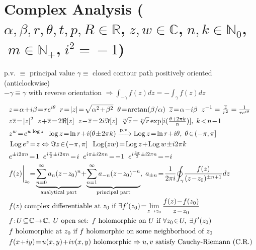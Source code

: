 \section*{Complex Analysis\normalfont\scriptsize{ ($\alpha,\beta,r,\theta,t,p,R\!\in\!\mathbb{R}$,$\;z,w\!\in\!\mathbb{C}$,$\;n,k\!\in\!\mathbb{N}_0$,$\;m\!\in\!\mathbb{N}_+$,$\;i^2\!=\!-1$)}}
\normalfont\scriptsize{ p.v. $\equiv$\! principal value \; $\gamma \equiv$ closed contour path positively oriented (anticlockwise)}\\
\normalfont\scriptsize{$-\gamma\equiv \gamma$ with reverse orientation $\Rightarrow\int_{-\gamma} f(z)dz= -\int_{\gamma}f(z)dz$}
\begin{align*}
&z\!=\!\alpha\!+\!i\beta\!=\!re^{i\theta}\;\;r\!=\!|z|\!=\!\sqrt{\alpha^2\!+\!\beta^2}\;\;\theta\!=\!\arctan(\beta/\alpha)\;\;\overline{z}\!=\!\alpha\!-\!i\beta \; \; z^{-1}=\tfrac{\overline{z}}{r^{2}} = \tfrac{1}{re^{i\theta}}\\
&z\overline{z}\!=\!|z|^2\;\;z\!+\!\overline{z}\!=\!2\Re[z]\;\;z\!-\!\overline{z}\!=\!2i\Im[z]\;\;\sqrt[n]{z}\!=\!\sqrt[n]{r}\exp[i(\tfrac{\theta+2\pi k}{n})],\;k\!<\!n\!-\!1 \\
&z^w\!=\!e^{w\log z}\;\;\log z\!=\!\ln r\!+\!i(\theta\!\pm\!2\pi k)\xrightarrow{\text{p.v.}}\operatorname{Log}z\!=\!\ln r\!+\!i\theta,\;\theta\!\in\!(-\pi,\pi] \\
&\operatorname{Log}e^z\!=\!z\Leftrightarrow\Im z\!\in\!(-\pi,\pi]\;\;\operatorname{Log}(zw)\!=\!\operatorname{Log}z\!+\!\operatorname{Log}w\!\pm\!i2\pi k \\
&e^{\pm i2\pi n}\!=\!1\;\;e^{i\frac{\pi}{2}\pm i2\pi n}\!=\!i\;\;e^{i\pi\pm i2\pi n}\!=\!-1\;\;e^{i\frac{3\pi}{2}\pm i2\pi n}\!=\!-i \\
&f(z)\bigg|_{z_0}\!\!=\!\underbrace{\sum_{n=0}^\infty a_n(z\!-\!z_0)^n}_{\text{\scriptsize analytical part}}\!+\!\underbrace{\sum_{n=1}^\infty a_{-n}(z\!-\!z_0)^{-n}}_{\text{\scriptsize principal part}},\;a_{\pm n}\!=\!\frac{1}{2\pi i}\!\oint_\gamma\!\frac{f(z)}{(z\!-\!z_0)^{\pm n+1}}dz \\
&\text{$f(z)$ complex differentiable at $z_0$ if }\exists f'(z_0)\!=\!\lim_{z\to z_0}\frac{f(z)\!-\!f(z_0)}{z\!-\!z_0} \\
&f\!:\!U\!\subseteq\!\mathbb{C}\!\to\!\mathbb{C},\;U\text{ open set: $f$ holomorphic on $U$ if }\forall z_0\!\in\!U,\;\exists f'(z_0) \\
&\text{$f$ holomorphic at $z_0$ if $f$ holomorphic on some neighborhood of $z_0$} \\
&f(x\!+\!iy)\!=\!u(x,y)\!+\!iv(x,y)\text{ holomorphic}\Rightarrow u,v\text{ satisfy Cauchy-Riemann (C.R.)} \\

\end{align*}
